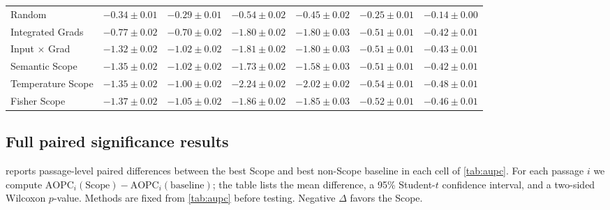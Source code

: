 \documentclass{article}
\begin{document}
\begin{table}[h]
{\begin{tabular}{lcccccc}
  Random              & $-0.34 \pm 0.01$ & $-0.29 \pm 0.01$ & $-0.54 \pm 0.02$ & $-0.45 \pm 0.02$ & $-0.25 \pm 0.01$ & $-0.14 \pm 0.00$ \\
  Integrated Grads    & $-0.77 \pm 0.02$ & $-0.70 \pm 0.02$ & $-1.80 \pm 0.02$ & $-1.80 \pm 0.03$ & $-0.51 \pm 0.01$ & $-0.42 \pm 0.01$ \\
  Input $\times$ Grad & $-1.32 \pm 0.02$ & $-1.02 \pm 0.02$ & $-1.81 \pm 0.02$ & $-1.80 \pm 0.03$ & $-0.51 \pm 0.01$ & $-0.43 \pm 0.01$ \\
  \hline
  Semantic Scope      & $-1.35 \pm 0.02$ & $-1.02 \pm 0.02$ & $-1.73 \pm 0.02$ & $-1.58 \pm 0.03$ & $-0.51 \pm 0.01$ & $-0.42 \pm 0.01$ \\
  Temperature Scope   & $-1.35 \pm 0.02$ & $-1.00 \pm 0.02$ & $\mathbf{-2.24 \pm 0.02}$ & $\mathbf{-2.02 \pm 0.02}$ & $\mathbf{-0.54 \pm 0.01}$ & $\mathbf{-0.48 \pm 0.01}$ \\
  Fisher Scope        & $\mathbf{-1.37 \pm 0.02}$ & $\mathbf{-1.05 \pm 0.02}$ & $-1.86 \pm 0.02$ & $-1.85 \pm 0.03$ & $-0.52 \pm 0.01$ & $-0.46 \pm 0.01$ \\
  \hline
  \end{tabular}}
\end{table}

\subsection{Full paired significance results}
\label{sec:paired_full}

 reports passage-level paired differences between the best Scope and best non-Scope baseline in each cell of \cref{tab:aupc}.
For each passage $i$ we compute $\mathrm{AOPC}_i(\mathrm{Scope})-\mathrm{AOPC}_i(\mathrm{baseline})$; the table lists the mean difference, a 95\% Student-$t$ confidence interval, and a two-sided Wilcoxon $p$-value.
Methods are fixed from \cref{tab:aupc} before testing.
Negative $\Delta$ favors the Scope.
\end{document}
